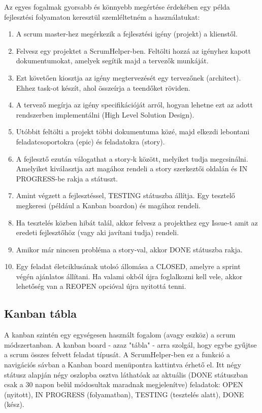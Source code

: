 Az egyes fogalmak gyorsabb és könnyebb megértése érdekében egy példa fejlesztési folyamaton keresztül szemléltetném a használatukat:

\begin{enumerate}
	\item A scrum master-hez megérkezik a fejlesztési igény (projekt) a klienstől.
	\item Felvesz egy projektet a ScrumHelper-ben. Feltölti hozzá az igényhez kapott dokumentumokat, amelyek segítik majd a tervezők munkáját.
	\item Ezt követően kiosztja az igény megtervezését egy tervezőnek (architect). Ehhez task-ot készít, ahol összeírja a teendőket röviden.
	\item A tervező megírja az igény specifikációját arról, hogyan lehetne ezt az adott rendszerben implementálni (High Level Solution Design).
	\item Utóbbit feltölti a projekt többi dokumentuma közé, majd elkezdi lebontani feladatcsoportokra (epic) és feladatokra (story).
	\item A fejlesztő ezután válogathat a story-k között, melyiket tudja megcsinálni. Amelyiket kiválasztja azt magához rendeli a story szerkeztői oldalán és IN PROGRESS-be rakja a státuszt.
	\item Amint végzett a fejlesztéssel, TESTING státuszba állítja. Egy tesztelő megkeresi (például a Kanban boardon) és magához rendeli.
	\item Ha tesztelés közben hibát talál, akkor felvesz a projekthez egy Issue-t amit az eredeti fejlesztőhöz (vagy aki javítani tudja) rendeli.
	\item Amikor már nincsen probléma a story-val, akkor DONE státuszba rakja.
	\item Egy feladat életciklusának utolsó állomása a CLOSED, amelyre a sprint végén ajánlatos állítani. Ha valami okból újra foglalkozni kell vele, akkor lehetőség van a REOPEN opcióval újra nyitottá tenni.
\end{enumerate}

\subsection{Kanban tábla}
\label{kanbanboard}

A kanban szintén egy egységesen használt fogalom (avagy eszköz) a scrum módszertanban. A kanban board - azaz "tábla" - arra szolgál, hogy egybe gyűjtse a scrum összes felvett feladat típusát. A ScrumHelper-ben ez a funkció a navigációs sávban a Kanban board menüpontra kattintva érhető el. Itt négy státusz alapján négy oszlopba osztva láthatóak az aktuális (DONE státuszban csak a 30 napon belül módosultak maradnak megjelenítve) feladatok: OPEN (nyitott), IN PROGRESS (folyamatban), TESTING (tesztelés alatt), DONE (kész).

